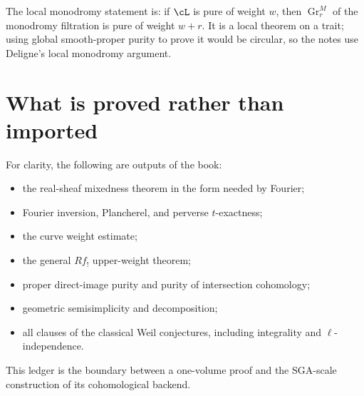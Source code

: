 The local monodromy statement is: if \(\cL\) is pure of weight \(w\), then
\(\operatorname{Gr}^M_r\) of the monodromy filtration is pure of weight
\(w+r\).  It is a local theorem on a trait; using global smooth-proper purity
to prove it would be circular, so the notes use Deligne's local
monodromy argument.

\section{What is proved rather than imported}

For clarity, the following are outputs of the book:

\begin{itemize}
\item the real-sheaf mixedness theorem in the form needed by Fourier;
\item Fourier inversion, Plancherel, and perverse \(t\)-exactness;
\item the curve weight estimate;
\item the general \(Rf_!\) upper-weight theorem;
\item proper direct-image purity and purity of intersection cohomology;
\item geometric semisimplicity and decomposition;
\item all clauses of the classical Weil conjectures, including integrality
      and \(\ell\)-independence.
\end{itemize}

This ledger is the boundary between a one-volume proof and the SGA-scale
construction of its cohomological backend.
